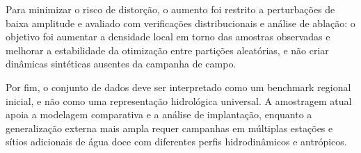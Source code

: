 Para minimizar o risco de distorção, o aumento foi restrito a perturbações de baixa amplitude e avaliado com verificações distribucionais e análise de ablação: o objetivo foi aumentar a densidade local em torno das amostras observadas e melhorar a estabilidade da otimização entre partições aleatórias, e não criar dinâmicas sintéticas ausentes da campanha de campo.

Por fim, o conjunto de dados deve ser interpretado como um benchmark regional inicial, e não como uma representação hidrológica universal. A amostragem atual apoia a modelagem comparativa e a análise de implantação, enquanto a generalização externa mais ampla requer campanhas em múltiplas estações e sítios adicionais de água doce com diferentes perfis hidrodinâmicos e antrópicos. 

